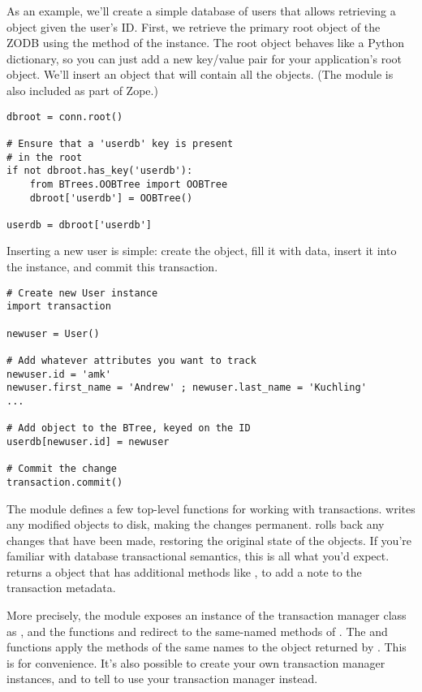 As an example, we'll create a simple database of users that allows
retrieving a  object given the user's ID.  First, we
retrieve the primary root object of the ZODB using the 
method of the  instance.  The root object behaves
like a Python dictionary, so you can just add a new key/value pair for
your application's root object.  We'll insert an  object
that will contain all the  objects.  (The
 module is also included as part of Zope.)

\begin{verbatim}
dbroot = conn.root()

# Ensure that a 'userdb' key is present 
# in the root
if not dbroot.has_key('userdb'):
    from BTrees.OOBTree import OOBTree
    dbroot['userdb'] = OOBTree()

userdb = dbroot['userdb']
\end{verbatim}

Inserting a new user is simple: create the  object, fill
it with data, insert it into the  instance, and commit
this transaction.

\begin{verbatim}# Create new User instance
import transaction

newuser = User() 

# Add whatever attributes you want to track
newuser.id = 'amk' 
newuser.first_name = 'Andrew' ; newuser.last_name = 'Kuchling'
...

# Add object to the BTree, keyed on the ID
userdb[newuser.id] = newuser

# Commit the change
transaction.commit()
\end{verbatim}

The  module defines a few top-level functions for
working with transactions.   writes any modified
objects to disk, making the changes permanent.   rolls
back any changes that have been made, restoring the original state of
the objects.  If you're familiar with database transactional
semantics, this is all what you'd expect.   returns a
 object that has additional methods like
, to add a note to the transaction metadata.

More precisely, the  module exposes an instance of
the  transaction manager class as
, and the  functions
 and  redirect to the same-named
methods of .  The  and
 functions apply the methods of the same names to
the  object returned by .
This is for convenience.  It's also possible to create your own transaction
manager instances, and to tell  to use your transaction
manager instead.

